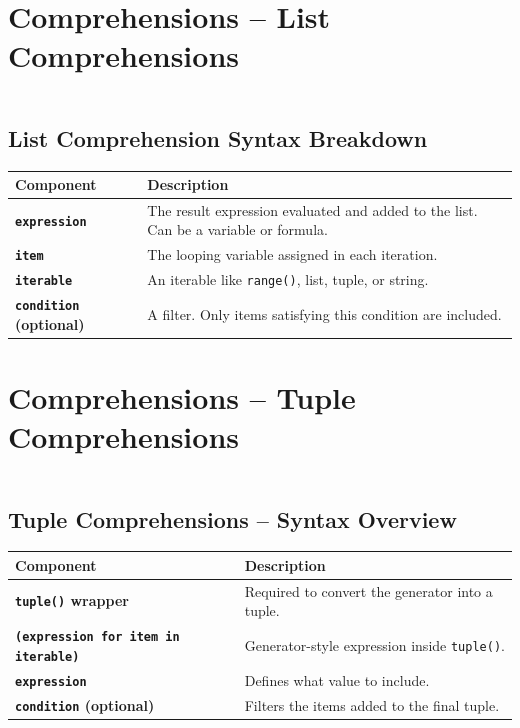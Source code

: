 \documentclass[a4paper,11pt]{article}
\begin{document}
	\newpage
	
\section{Comprehensions – List Comprehensions}
\inputminted{python}{Python_Files/comprehensions_list_guid.py}

\vspace{1em}
\subsection*{List Comprehension Syntax Breakdown}

\renewcommand{\arraystretch}{1.6}
\begin{tabular}{>{\bfseries}p{3.8cm} p{9.2cm}}
	\toprule
	Component & Description \\
	\midrule
	
	\texttt{expression} & The result expression evaluated and added to the list. Can be a variable or formula. \\
	\texttt{item}       & The looping variable assigned in each iteration. \\
	\texttt{iterable}   & An iterable like \texttt{range()}, list, tuple, or string. \\
	\texttt{condition} (optional) & A filter. Only items satisfying this condition are included. \\
	
	\bottomrule
\end{tabular}

	\newpage
	
	\section{Comprehensions – Tuple Comprehensions}
	\inputminted{python}{Python_Files/comprehensions_tuple_guid.py}
	
	\vspace{1em}
	\subsection*{Tuple Comprehensions – Syntax Overview}
	
	\renewcommand{\arraystretch}{1.6}
	\begin{tabular}{>{\bfseries}p{3.8cm} p{9.2cm}}
		\toprule
		Component & Description \\
		\midrule
		
		\texttt{tuple()} wrapper & Required to convert the generator into a tuple. \\
		\texttt{(expression for item in iterable)} & Generator-style expression inside \texttt{tuple()}. \\
		\texttt{expression} & Defines what value to include. \\
		\texttt{condition} (optional) & Filters the items added to the final tuple. \\
		
		\bottomrule
	\end{tabular}
	
\end{document}
